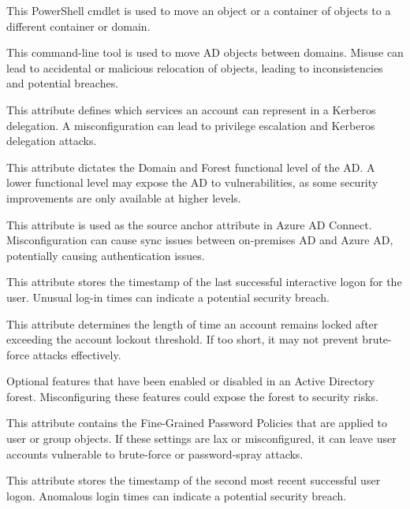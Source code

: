  This PowerShell cmdlet is used to move an object or a container of objects to a different container or domain. 

 This command-line tool is used to move AD objects between domains. Misuse can lead to accidental or malicious relocation of objects, leading to inconsistencies and potential breaches.

 This attribute defines which services an account can represent in a Kerberos delegation. A misconfiguration can lead to privilege escalation and Kerberos delegation attacks.

 This attribute dictates the Domain and Forest functional level of the AD. A lower functional level may expose the AD to vulnerabilities, as some security improvements are only available at higher levels.

 This attribute is used as the source anchor attribute in Azure AD Connect. Misconfiguration can cause sync issues between on-premises AD and Azure AD, potentially causing authentication issues.

 This attribute stores the timestamp of the last successful interactive logon for the user. Unusual log-in times can indicate a potential security breach.

 This attribute determines the length of time an account remains locked after exceeding the account lockout threshold. If too short, it may not prevent brute-force attacks effectively.

 Optional features that have been enabled or disabled in an Active Directory forest. Misconfiguring these features could expose the forest to security risks.

 This attribute contains the Fine-Grained Password Policies that are applied to user or group objects. If these settings are lax or misconfigured, it can leave user accounts vulnerable to brute-force or password-spray attacks.

 This attribute stores the timestamp of the second most recent successful user logon. Anomalous login times can indicate a potential security breach.


